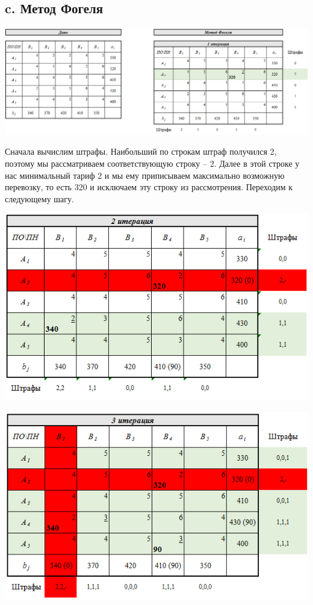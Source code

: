 \documentclass[14pt,a4paper,fleqn]{extarticle}
\begin{document}
\subsection*{c. Метод Фогеля}
\begin{center}
	\includegraphics[scale=0.45]{4}
\end{center}
Сначала вычислим штрафы. Наибольший по строкам штраф получился 2, поэтому мы рассматриваем соответствующую строку -- 2. Далее в этой строке у нас минимальный тариф 2 и мы ему приписываем максимально возможную перевозку, то есть 320 и исключаем эту строку из рассмотрения. Переходим к следующему шагу.
\begin{center}
	\includegraphics[scale=0.7]{5}
\end{center}
\newpage
\begin{center}
	\includegraphics[scale=0.7]{6}
\end{center}
\end{document}
